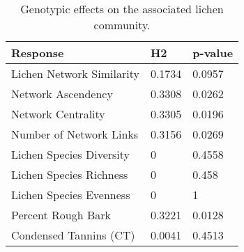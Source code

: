 \begin{table}[ht]
\centering
\begin{tabular}{lll}
  \hline
Response & H2 & p-value \\ 
  \hline
Lichen Network Similarity & 0.1734 & 0.0957 \\ 
  Network Ascendency & 0.3308 & 0.0262 \\ 
  Network Centrality & 0.3305 & 0.0196 \\ 
  Number of Network Links & 0.3156 & 0.0269 \\ 
  Lichen Species Diversity & 0 & 0.4558 \\ 
  Lichen Species Richness & 0 & 0.458 \\ 
  Lichen Species Evenness & 0 & 1 \\ 
  Percent Rough Bark & 0.3221 & 0.0128 \\ 
  Condensed Tannins (CT) & 0.0041 & 0.4513 \\ 
   \hline
\end{tabular}
\caption{Genotypic effects on the associated lichen community.} 
\label{tab:h2_table}
\end{table}
